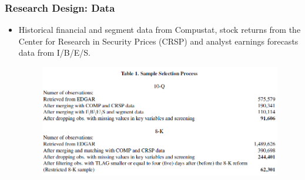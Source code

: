 \documentclass{beamer}
\begin{document}
\begin{frame}
\frametitle{Research Design: Data}

\begin{itemize}
	\item Historical financial and segment data from Compustat, stock returns from the Center for Research in Security Prices (CRSP) and analyst earnings forecasts data from I/B/E/S.
	
	\begin{figure}[h]
		\centering
		\includegraphics[width=0.8\linewidth]{tab1}
		\label{tab1}
	\end{figure}

\end{itemize}
\end{frame}
\end{document}
